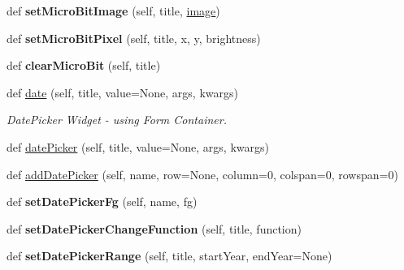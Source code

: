 \begin{DoxyCompactItemize}
\mbox{\label{class_python_01_g_u_i_1_1appjar_1_1gui_aa0255d25eb69d3f5d00afbc131c6c1b0}} 
def {\bfseries set\+Micro\+Bit\+Image} (self, title, \hyperlink{class_python_01_g_u_i_1_1appjar_1_1gui_a17243935a5285eba9b2b6b0eb3e9d86a}{image})
\item 
\mbox{\label{class_python_01_g_u_i_1_1appjar_1_1gui_a3a2f60b555042fc5b1bc4f56a422353e}} 
def {\bfseries set\+Micro\+Bit\+Pixel} (self, title, x, y, brightness)
\item 
\mbox{\label{class_python_01_g_u_i_1_1appjar_1_1gui_ada07d01fad302cc715f8da54dda94e56}} 
def {\bfseries clear\+Micro\+Bit} (self, title)
\item 
def \hyperlink{class_python_01_g_u_i_1_1appjar_1_1gui_aaf78746829437a637aad1f56fa01efd1}{date} (self, title, value=None, args, kwargs)
\begin{DoxyCompactList}\small\item\em Date\+Picker Widget -\/ using Form Container. \end{DoxyCompactList}\item 
def \hyperlink{class_python_01_g_u_i_1_1appjar_1_1gui_a0178a2b0b77cd74bd17216d1ecf67749}{date\+Picker} (self, title, value=None, args, kwargs)
\item 
def \hyperlink{class_python_01_g_u_i_1_1appjar_1_1gui_a4848639278093b1bc6565ba9626f6a26}{add\+Date\+Picker} (self, name, row=None, column=0, colspan=0, rowspan=0)
\item 
\mbox{\label{class_python_01_g_u_i_1_1appjar_1_1gui_a29884be39e2dd07ceef314bd9ecf8236}} 
def {\bfseries set\+Date\+Picker\+Fg} (self, name, fg)
\item 
\mbox{\label{class_python_01_g_u_i_1_1appjar_1_1gui_aa9e2c99351ec43622816b59356081c76}} 
def {\bfseries set\+Date\+Picker\+Change\+Function} (self, title, function)
\item 
\mbox{\label{class_python_01_g_u_i_1_1appjar_1_1gui_ae2959ebae96fe64e3207944b5a3b7753}} 
def {\bfseries set\+Date\+Picker\+Range} (self, title, start\+Year, end\+Year=None)
\item 

\end{DoxyCompactItemize}
